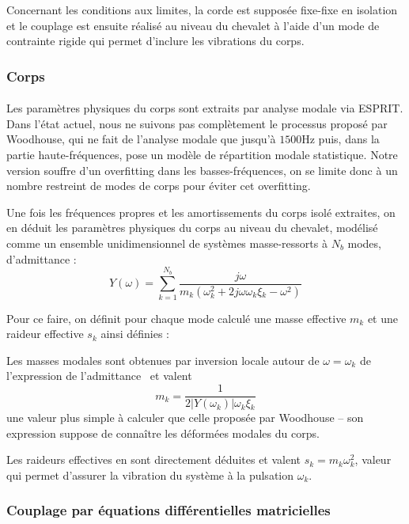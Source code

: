   Concernant les conditions aux limites, la corde est supposée fixe-fixe
en isolation et le couplage est ensuite réalisé au niveau du chevalet à l'aide
d'un mode de contrainte rigide qui permet d'inclure les vibrations du corps.

\subsubsection{Corps}

  \paragraph{}
  Les paramètres physiques du corps sont extraits par analyse modale via ESPRIT.
Dans l'état actuel, nous ne suivons pas complètement le processus proposé par
Woodhouse, qui ne fait de l'analyse modale que jusqu'à \( \si{1500\hertz} \)
puis, dans la partie haute-fréquences, pose un modèle de répartition modale
statistique.
Notre version souffre d'un overfitting dans les basses-fréquences, on se limite
donc à un nombre restreint de modes de corps pour éviter cet overfitting.

  Une fois les fréquences propres et les amortissements du corps isolé
extraites, on en déduit les paramètres physiques du corps au niveau du
chevalet, modélisé comme un ensemble unidimensionnel de systèmes masse-ressorts
à \( N_b \) modes, d'admittance :
  \[ Y(\omega) = \sum_{k=1}^{N_b} \frac{j\omega{}}
    {m_k(\omega_k^2 + 2 j \omega{} \omega{}_k \xi{}_k - \omega{}^2)} \]
    
Pour ce faire, on définit pour chaque mode calculé une masse effective
\( m_k \) et une raideur effective \( s_k \) ainsi définies :

  Les masses modales sont obtenues par inversion locale autour de
\( \omega = \omega_k \) de l'expression de l'admittance~\cite{pate14:phd} et
valent \[ m_k = \frac{1}{2 |Y(\omega_k)| \omega{}_k \xi{}_k} \] une valeur plus
simple à calculer que celle proposée par Woodhouse -- son expression suppose de
connaître les déformées modales du corps.

  Les raideurs effectives en sont directement déduites et valent
\( s_k = m_k \omega{}_k^2 \), valeur qui permet d'assurer la vibration du système
à la pulsation \( \omega{}_k \).

\subsubsection{Couplage par équations différentielles matricielles}

